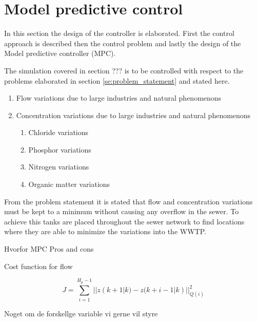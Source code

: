 \section{Model predictive control}\label{se:model_predictive_control}
In this section the design of the controller is elaborated. First the control approach is described then the control problem and lastly the design of the Model predictive controller (MPC). 

The simulation covered in section ??? is to be controlled with respect to the problems elaborated in section \ref{se:problem_statement} and stated here. 
\begin{enumerate}
\item Flow variations due to large industries and natural phenomenons
\item Concentration variations due to large industries and natural phenomenons
\begin{enumerate}
	\item Chloride variations
	\item Phosphor variations
	\item Nitrogen variations
	\item Organic matter variations
\end{enumerate}
\end{enumerate}

From the problem statement it is stated that flow and concentration variations must be kept to a minimum without causing any overflow in the sewer. To achieve this tanks are placed throughout the sewer network to find locations where they are able to minimize the variations into the WWTP. 



Hvorfor MPC
	Pros and cons



Cost function for flow

\begin{equation}
	 J = \sum_{i=1}^{H_p-1} || z(k+1|k)-z(k+i-1|k)||_{Q(i)}^2
\end{equation}


Noget om de forskellge variable vi gerne vil styre



